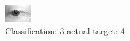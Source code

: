 \begin{figure}[h!]
\begin{center}
\includegraphics[width=0.60\columnwidth]{figures/ID2667_class_3_target_4.png}
\end{center}
\caption{ Classification: 3 actual target: 4}
\label{fig:ID2667_class_3_target_4}
\end{figure}
